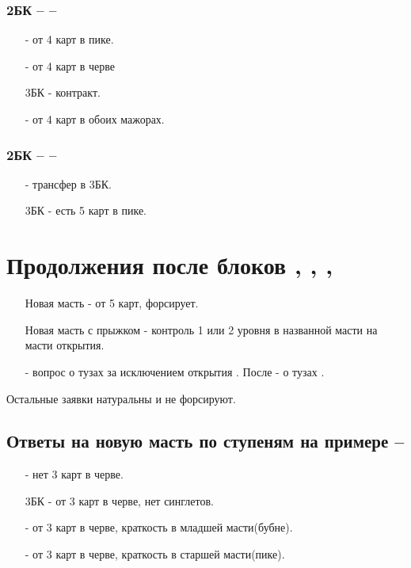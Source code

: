 \documentclass{article}
\begin{document}
\subsubsection{2БК --  -- }
\begin{enumerate}
    \item[\he{3}] - от 4 карт в пике.
    \item[\sp{3}] - от 4 карт в черве
    \item[3БК] - контракт.
    \item[\cl{4}] - от 4 карт в обоих мажорах.
\end{enumerate}
\subsubsection{2БК --  -- }
\begin{enumerate}
    \item[\sp{3}] - трансфер в 3БК.
    \item[3БК] - есть 5 карт в пике.
\end{enumerate}
\section{Продолжения после блоков , , , }
\begin{enumerate}
    \item[Новая масть] - от 5 карт, форсирует. 
    \item[Новая масть с прыжком] - контроль 1 или 2 уровня в названной масти на масти открытия.
    \item[\cl{4}] - вопрос о тузах за исключением открытия . После  - о тузах .
\end{enumerate}
Остальные заявки натуральны и не форсируют.
\subsection{Ответы на новую масть по ступеням на примере  -- }
\begin{enumerate}
    \item[\sp{3}] - нет 3 карт в черве.
    \item[3БК] -  от 3 карт в черве, нет синглетов.
    \item[\cl{4}] -  от 3 карт в черве, краткость в младшей масти(бубне).
    \item[\di{4}] - от 3 карт в черве, краткость в старшей масти(пике).
\end{enumerate}
\end{document}
